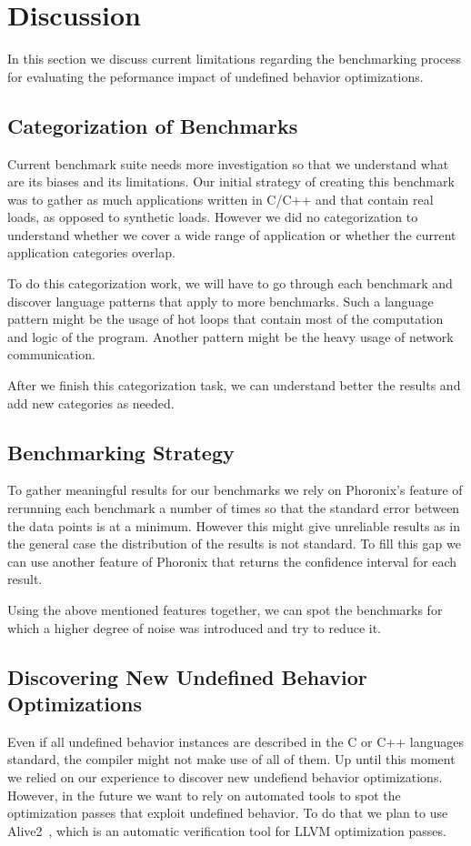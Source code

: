 \section{Discussion} \label{sec:discussion}

In this section we discuss current limitations regarding the benchmarking
process for evaluating the peformance impact of undefined behavior
optimizations.

\subsection{Categorization of Benchmarks}

Current benchmark suite needs more investigation so that we understand what are
its biases and its limitations. Our initial strategy of creating this benchmark
was to gather as much applications written in C/C++ and that contain real loads,
as opposed to synthetic loads. However we did no categorization to understand
whether we cover a wide range of application or whether the current application
categories overlap.

To do this categorization work, we will have to go through each benchmark and
discover language patterns that apply to more benchmarks. Such a language
pattern might be the usage of hot loops that contain most of the computation and
logic of the program. Another pattern might be the heavy usage of network
communication.

After we finish this categorization task, we can understand better the results
and add new categories as needed.

\subsection{Benchmarking Strategy}

To gather meaningful results for our benchmarks we rely on Phoronix's feature of
rerunning each benchmark a number of times so that the standard error between
the data points is at a minimum. However this might give unreliable results as
in the general case the distribution of the results is not standard. To fill
this gap we can use another feature of Phoronix that returns the confidence
interval for each result.

Using the above mentioned features together, we can spot the benchmarks for
which a higher degree of noise was introduced and try to reduce it. 

\subsection{Discovering New Undefined Behavior Optimizations}

Even if all undefined behavior instances are described in the C or C++ languages
standard, the compiler might not make use of all of them. Up until this moment
we relied on our experience to discover new undefiend behavior optimizations.
However, in the future we want to rely on automated tools to spot the
optimization passes that exploit undefined behavior. To do that we plan to use
Alive2~\cite{lopes2021alive2}, which is an automatic verification tool for LLVM
optimization passes.
